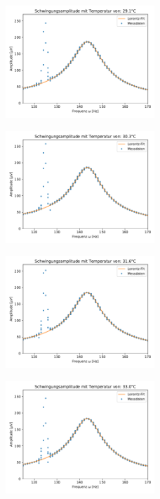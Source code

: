 \documentclass{article}
\begin{document}
\begin{figure}
\centering
\includegraphics[width=0.5\textwidth]{Resonanz140_temp5.pdf}
\end{figure}
\begin{figure}
\centering
\includegraphics[width=0.5\textwidth]{Resonanz140_temp6.pdf}
\end{figure}
\begin{figure}
\centering
\includegraphics[width=0.5\textwidth]{Resonanz140_temp7.pdf}
\end{figure}
\begin{figure}
\centering
\includegraphics[width=0.5\textwidth]{Resonanz140_temp8.pdf}
\end{figure}
\end{document}
